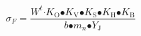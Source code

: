 \begin{equation}
{\sigma }_F\mathrm{=}\frac{W^t\mathrm{\cdot }K_{\mathrm{O}}\mathrm{\bullet }K_{\mathrm{V}}\mathrm{\bullet }K_{\mathrm{S}}\mathrm{\bullet }K_{\mathrm{H}}\mathrm{\bullet }K_{\mathrm{B}}}{b\mathrm{\bullet }m_n\mathrm{\bullet }Y_{\mathrm{J}}}
\end{equation}